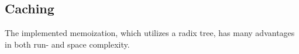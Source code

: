 \subsection{Caching} \label{subs_evalcaching}

The implemented memoization, which utilizes a radix tree, has many advantages in both run- and space complexity.